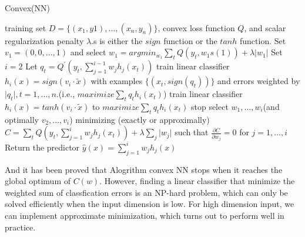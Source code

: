 \documentclass{article}
\begin{document}
\begin{algorithm}[htb]
	\caption{Convex(NN)}
	\begin{algorithmic}[1]
		\REQUIRE
		training set $D = \{ (x_{1},y{1}),...,(x_{n},y_{n})\}$, convex loss function $Q$, and scalar regularization penalty $\lambda$.s is either the $sign$ function or the $tanh$ function.
		\STATE Set $v_{1} = (0,0,...,1)$ and select $w_{1} = argmin_{w_{1}} \sum_{t} Q(y_{t},w_{1}s(1))+\lambda \lvert w_{1} \rvert$
		\STATE Set $i = 2$
		\STATE Let $q_{t} = Q^{'}(y_{t},\sum_{j=1}^{i-1} w_{j}h_{j}(x_t))$
		\STATE train linear classifier $h_{i}(x) = sign(v_{i}\cdot \tilde{x})$ with examples $\{(x_{t}, sign(q_{t}))\}$ and errors weighted by $\lvert q_{t} \rvert, t=1,...,n$.(i.e., $maximize \sum_{t} q_{t}h_{i}(x_{t})$)
		\STATE train linear classifier $h_{i}(x) = tanh(v_{i}\cdot \tilde{x})$ to $maximize \sum_{t} q_{t}h_{i}(x_{t})$
		\ENDIF
		\STATE stop
		\ENDIF
		\STATE select $w_{1},...,w_{i}$(and optimally $v_{2},...,v_{i}$) minimizing (exactly or approximally) $C = \sum_{t}Q(y_{t},\sum_{j=1}^{i} w_{j}h_{j}(x_{t})) + \lambda \sum_{j}\lvert w_{j} \rvert$ such that 
		$\frac{\partial C}{\partial w_{j}} = 0$ for $j=1,...,i$
		\STATE Return the predictor $\hat{y}(x) = \sum_{j=1}^{i} w_{j}h_{j}(x)$
		\ENDWHILE
	\end{algorithmic}
\end{algorithm}

And it has been proved that Alogrithm convex NN stops when it reaches the global optimum of $C(w)$. However, finding a linear classifier that minimize the weighted sum of classfication errors is an NP-hard problem, which can only be solved  efficiently when the input dimension is low. For high dimension input, we can implement approximate minimization, which turns out to perform well in practice.
\end{document}
